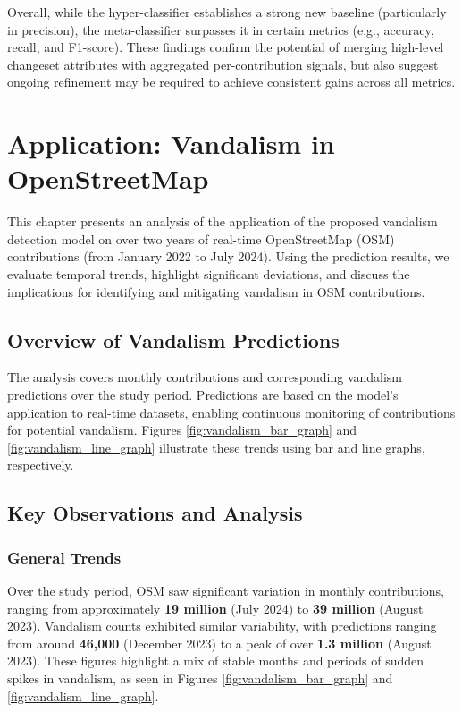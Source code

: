 \documentclass[
    13pt, %
    a4paper, %
    listof=totoc, %
    bibliography=totoc, %
    index=totoc, %
    headsepline
]{scrreprt}
\begin{document}
Overall, while the hyper-classifier establishes a strong new baseline (particularly in precision), the meta-classifier surpasses it in certain metrics (e.g., accuracy, recall, and F1-score). These findings confirm the potential of merging high-level changeset attributes with aggregated per-contribution signals, but also suggest ongoing refinement may be required to achieve consistent gains across all metrics.




\chapter{Application: Vandalism in OpenStreetMap} \label{chapter:application}

This chapter presents an analysis of the application of the proposed vandalism detection model on over two years of real-time OpenStreetMap (OSM) contributions (from January 2022 to July 2024). Using the prediction results, we evaluate temporal trends, highlight significant deviations, and discuss the implications for identifying and mitigating vandalism in OSM contributions.

\section{Overview of Vandalism Predictions}
The analysis covers monthly contributions and corresponding vandalism predictions over the study period. Predictions are based on the model's application to real-time datasets, enabling continuous monitoring of contributions for potential vandalism. Figures \ref{fig:vandalism_bar_graph} and \ref{fig:vandalism_line_graph} illustrate these trends using bar and line graphs, respectively.

\section{Key Observations and Analysis}

\subsection{General Trends}
Over the study period, OSM saw significant variation in monthly contributions, ranging from approximately \textbf{19 million} (July 2024) to \textbf{39 million} (August 2023). Vandalism counts exhibited similar variability, with predictions ranging from around \textbf{46,000} (December 2023) to a peak of over \textbf{1.3 million} (August 2023). These figures highlight a mix of stable months and periods of sudden spikes in vandalism, as seen in Figures \ref{fig:vandalism_bar_graph} and \ref{fig:vandalism_line_graph}.
\end{document}
